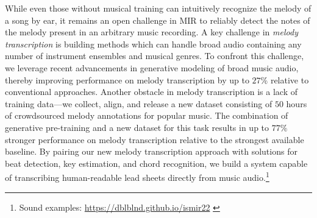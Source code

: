 While even those without musical training can intuitively recognize the melody of a song by ear, 
it remains an open challenge in MIR to reliably detect the notes of the melody present in an arbitrary music recording. 
A key challenge in \emph{melody transcription} is building methods which can handle broad audio containing any number of instrument ensembles and musical genres. 
To confront this challenge, we leverage recent advancements in generative modeling of broad music audio, thereby improving performance on melody transcription by 
up to $27$\% 
relative to conventional approaches. 
Another obstacle in melody transcription is a lack of training data---we collect, align, and release a new dataset consisting of $50$ hours of crowdsourced melody annotations for popular music. 
The combination of generative pre-training and a new dataset for this task results in up to $77\%$ stronger performance on melody transcription relative to the strongest available baseline. 
By pairing our new melody transcription approach with solutions for beat detection, key estimation, and chord recognition, 
we build a system capable of transcribing human-readable lead sheets directly from music audio.\footnote{Sound examples: \url{https://dblblnd.github.io/ismir22} %
\label{sound_examples}}